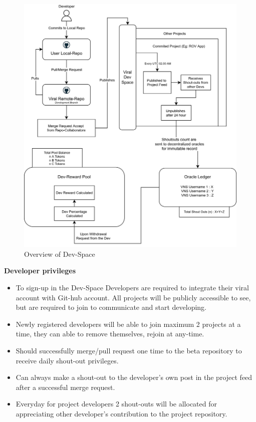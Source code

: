 \documentclass[10pt]{article}
\begin{document}
\begin{figure}
\begin{center}
\includegraphics[width=\textwidth]{devspace-overview}
\caption{Overview of Dev-Space}
\end{center}
\end{figure}

\textbf{Developer privileges}

\begin{itemize}[leftmargin=+0.2in]
\item To sign-up in the Dev-Space Developers are required to integrate their viral account with Git-hub account. All projects will be publicly accessible to see, but are required to join to communicate and start developing.
\item Newly registered developers will be able to join maximum 2 projects at a time, they can able to remove themselves, rejoin at any-time.
\item Should successfully merge/pull request one time to the beta repository to receive daily shout-out privileges.
\item Can always make a shout-out to the developer's own post in the project feed after a successful merge request.
\item Everyday for project developers 2 shout-outs will be allocated for appreciating other developer's contribution to the project repository.
\end{itemize}
\end{document}
